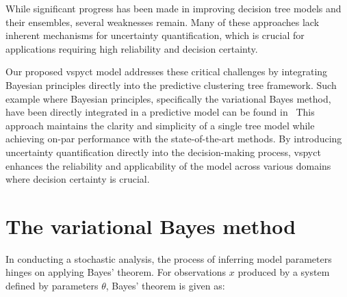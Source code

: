 \documentclass[3p,review,authoryear]{elsarticle}
\begin{document}
\begin{table}[htbp]
\centering
\caption{Comparative summary of predictive clustering methods}
\label{tab:model_comparison}
\end{table}


While significant progress has been made in improving decision tree models and their ensembles, several weaknesses remain.
Many of these approaches lack inherent mechanisms for uncertainty quantification, which is crucial for applications requiring high reliability and decision certainty.

Our proposed \gls{vspyct} model addresses these critical challenges by integrating Bayesian principles directly into the predictive clustering tree framework.
Such example where Bayesian principles, specifically the variational Bayes method, have been directly integrated in a predictive model can be found in~\cite{Bo_koski_2021, lopez2023informative}
This approach maintains the clarity and simplicity of a single tree model while achieving on-par performance with the state-of-the-art methods.
By introducing uncertainty quantification directly into the decision-making process, \gls{vspyct} enhances the reliability and applicability of the model across various domains where decision certainty is crucial.


\section{The variational Bayes method}

In conducting a stochastic analysis, the process of inferring model parameters hinges on applying Bayes' theorem.
For observations $x$ produced by a system defined by parameters $\theta$, Bayes' theorem is given as:
\end{document}

